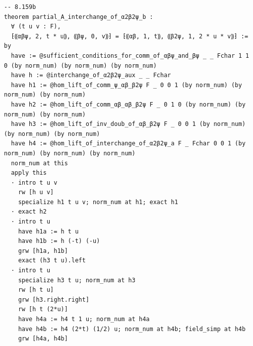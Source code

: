 \documentclass[10pt,a4paper]{article}
\begin{document}
\begin{Verbatim}
-- 8.159b
theorem partial_A_interchange_of_α2β2ψ_b :
  ∀ (t u v : F),
  ⁅⸨αβψ, 2, t * u⸩, ⸨βψ, 0, v⸩⁆ = ⁅⸨αβ, 1, t⸩, ⸨β2ψ, 1, 2 * u * v⸩⁆ := by
  have := @sufficient_conditions_for_comm_of_αβψ_and_βψ _ _ Fchar 1 1 0 (by norm_num) (by norm_num) (by norm_num)
  have h := @interchange_of_α2β2ψ_aux _ _ Fchar
  have h1 := @hom_lift_of_comm_ψ_αβ_β2ψ F _ 0 0 1 (by norm_num) (by norm_num) (by norm_num)
  have h2 := @hom_lift_of_comm_αβ_αβ_β2ψ F _ 0 1 0 (by norm_num) (by norm_num) (by norm_num)
  have h3 := @hom_lift_of_inv_doub_of_αβ_β2ψ F _ 0 0 1 (by norm_num) (by norm_num) (by norm_num)
  have h4 := @hom_lift_of_interchange_of_α2β2ψ_a F _ Fchar 0 0 1 (by norm_num) (by norm_num) (by norm_num)
  norm_num at this
  apply this
  · intro t u v
    rw [h u v]
    specialize h1 t u v; norm_num at h1; exact h1
  · exact h2
  · intro t u
    have h1a := h t u
    have h1b := h (-t) (-u)
    grw [h1a, h1b]
    exact (h3 t u).left
  · intro t u
    specialize h3 t u; norm_num at h3
    rw [h t u]
    grw [h3.right.right]
    rw [h t (2*u)]
    have h4a := h4 t 1 u; norm_num at h4a
    have h4b := h4 (2*t) (1/2) u; norm_num at h4b; field_simp at h4b
    grw [h4a, h4b]


\end{Verbatim}
\end{document}
